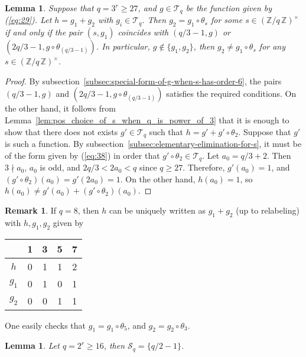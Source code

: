 \documentclass{amsart}[11pt]
\newtheorem{lem}[thm]{Lemma}
\theoremstyle{definition}
\newtheorem{rem}[thm]{Remark}
\numberwithin{equation}{section}
\theoremstyle{notitle}
\begin{document}
\begin{lem}\label{lem:not-isogenous-q-power-of-3}
  Suppose that $q=3^r\geq 27$, and $g\in {\mathscr{T}}_q$ be the function given
  by (\ref{eq:29}).  Let $h=g_1+g_2$ with $g_i\in {\mathscr{T}}_q$.  Then
  $g_2=g_1\circ \theta_s$ for some $s\in {(\mathbb{Z}/ {q}\, \mathbb{Z})^\times}$ if and only if the
  pair $(s, g_1)$ coincides with $(q/3-1,g)$ or $(2q/3-1, g\circ
  \theta_{(q/3-1)})$. In particular, $g\not\in \{ g_1, g_2\}$, then
  $g_2\neq g_1\circ \theta_s$ for any $s\in {(\mathbb{Z}/ {q}\, \mathbb{Z})^\times}$.
\end{lem}
\begin{proof}
  By subsection~\ref{subsec:special-form-of-g-when-s-has-order-6}, the
  pairs $(q/3-1,g)$ and $(2q/3-1, g\circ \theta_{(q/3-1)})$ satisfies
  the required conditions. On the other hand, it follows from
  Lemma~\ref{lem:pos_choice_of_s_when_q_is_power_of_3} that it is
  enough to show that there does not exists $g'\in {\mathscr{T}}_q$ such that
  $h=g'+g'\circ \theta_2$. Suppose that $g'$ is such a function.  By
  subsection~\ref{subsec:elementary-elimination-for-s}, it must be of
  the form given by (\ref{eq:38}) in order that $g'\circ \theta_2\in
  {\mathscr{T}}_q$. Let $a_0= q/3+2$. Then $3\nmid a_0$, $a_0$ is odd, and
  $2q/3<2a_0<q$ since $q\geq 27$. Therefore, $g'(a_0)=1$, and
  $(g'\circ \theta_2)(a_0)= g'(2a_0)= 1$.  On the other hand,
  $h(a_0)=1$, so $h(a_0)\neq g'(a_0)+ (g'\circ \theta_2)(a_0)$.
\end{proof}

\begin{rem}\label{rem:case-q-is-8}
If $q=8$, then $h$ can be uniquely written as $g_1+g_2$ (up to
relabeling) with $h, g_1, g_2$ given by 
  \begin{center}
  \begin{tabular}{|c||c|c|c|c|}
\hline
    & 1 & 3 & 5 & 7   \\
\hline
  $h$ & 0 & 1 & 1 & 2  \\
  $g_1$& 0 & 1 & 0 & 1  \\
  $g_2$& 0 & 0 & 1 & 1 \\
\hline
  \end{tabular}
  \end{center}
One easily checks that $g_1=g_1\circ \theta_5$, and $g_2=g_2\circ
\theta_3$. 
  
  
  
  
  
\end{rem}

\begin{lem}\label{lem:q-is-a-power-of-2}
Let $q=2^r\geq 16$, then ${\mathscr{S}}_q=\{q/2-1\}$.  
\end{lem}
\end{document}
